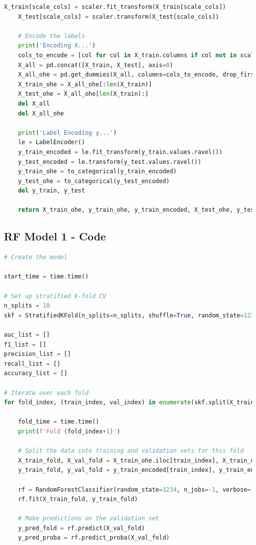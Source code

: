 \begin{appendices}
\begin{lstlisting}[language=Python]
    X_train[scale_cols] = scaler.fit_transform(X_train[scale_cols])
    X_test[scale_cols] = scaler.transform(X_test[scale_cols])

    # Encode the labels
    print('Encoding X...')
    cols_to_encode = [col for col in X_train.columns if col not in scale_cols]
    X_all = pd.concat([X_train, X_test], axis=0)
    X_all_ohe = pd.get_dummies(X_all, columns=cols_to_encode, drop_first=True, dtype=np.uint8)
    X_train_ohe = X_all_ohe[:len(X_train)]
    X_test_ohe = X_all_ohe[len(X_train):]
    del X_all
    del X_all_ohe

    print('Label Encoding y...')
    le = LabelEncoder()
    y_train_encoded = le.fit_transform(y_train.values.ravel())
    y_test_encoded = le.transform(y_test.values.ravel())
    y_train_ohe = to_categorical(y_train_encoded)
    y_test_ohe = to_categorical(y_test_encoded)
    del y_train, y_test

    return X_train_ohe, y_train_ohe, y_train_encoded, X_test_ohe, y_test_ohe, y_test_encoded	
\end{lstlisting}

\subsection{RF Model 1 - Code}
\label{appx: RF Model 1 - Code}
\begin{lstlisting}[language=Python]
# Create the model

start_time = time.time()

# Set up stratified k-fold CV
n_splits = 10
skf = StratifiedKFold(n_splits=n_splits, shuffle=True, random_state=1234)

auc_list = []
f1_list = []
precision_list = []
recall_list = []
accuracy_list = []

# Iterate over each fold
for fold_index, (train_index, val_index) in enumerate(skf.split(X_train_ohe, y_train_encoded)):

    fold_time = time.time()
    print(f'Fold {fold_index+1}')

    # Split the data into training and validation sets for this fold
    X_train_fold, X_val_fold = X_train_ohe.iloc[train_index], X_train_ohe.iloc[val_index]
    y_train_fold, y_val_fold = y_train_encoded[train_index], y_train_encoded[val_index]

    rf = RandomForestClassifier(random_state=1234, n_jobs=-1, verbose=1)
    rf.fit(X_train_fold, y_train_fold)
    
    # Make predictions on the validation set
    y_pred_fold = rf.predict(X_val_fold)
    y_pred_proba = rf.predict_proba(X_val_fold)
    

\end{lstlisting}
\end{appendices}
